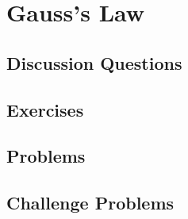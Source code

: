
\chapter{Gauss's Law}

\section{Discussion Questions}

\section{Exercises}

\section{Problems}

\section{Challenge Problems}
